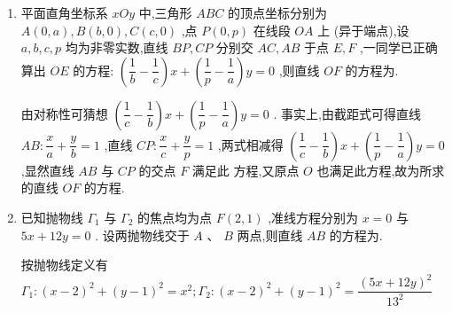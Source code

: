 \begin{enumerate}
\begin{jieda}
        $AF: y = 2\sqrt{2}\left(x-\dfrac{p}{2}\right)$，$BC: y = -\dfrac{\sqrt{2}}{4}\left(x-\dfrac{7p}{2}\right)$

        联立解得$E\left(\dfrac{5p}{6}, \dfrac{2\sqrt{2}p}{3}\right)$，故$\vv{EA} = \left(\dfrac{p}{6}, \dfrac{\sqrt{2}p}{3}\right)$，$\vv{EC} = \left(\dfrac{8p}{3}, -\dfrac{2\sqrt{2}p}{3}\right)$，故$S_{\triangle ACE} = \dfrac{1}{2}\left|\dfrac{p}{6} \times \left(-\dfrac{2\sqrt{2}p}{3} + \dfrac{\sqrt{2}p}{3} \times \dfrac{8p}{3}\right)\right| = 3\sqrt{2}$，解得$p = \sqrt{6}$
    \end{jieda}
    \item 平面直角坐标系 ${xOy}$ 中,三角形 ${ABC}$ 的顶点坐标分别为 $A\left( {0,a}\right) ,B\left( {b,0}\right) ,C\left( {c,0}\right)$ ,点 $P\left( {0,p}\right)$ 在线段 ${OA}$ 上 (异于端点),设 $a,b,c,p$ 均为非零实数,直线 ${BP},{CP}$ 分别交 ${AC},{AB}$ 于点 $E,F$ ,一同学已正确算出 ${OE}$ 的方程: $\left( {\dfrac{1}{b} - \dfrac{1}{c}}\right) x + \left( {\dfrac{1}{p} - \dfrac{1}{a}}\right) y = 0$ ,则直线 ${OF}$ 的方程为.
    \begin{jieda}
        由对称性可猜想 $\left( {\dfrac{1}{c} - \dfrac{1}{b}}\right) x + \left( {\dfrac{1}{p} - \dfrac{1}{a}}\right) y = 0$ .
        事实上,由截距式可得直线 ${AB} : \dfrac{x}{a} + \dfrac{y}{b} = 1$ ,直线 ${CP} : \dfrac{x}{c} + \dfrac{y}{p} = 1$ ,两式相减得 $\left( {\dfrac{1}{c} - \dfrac{1}{b}}\right) x + \left( {\dfrac{1}{p} - \dfrac{1}{a}}\right) y = 0$ ,显然直线 ${AB}$ 与 ${CP}$ 的交点 $F$ 满足此
        方程,又原点 $O$ 也满足此方程,故为所求的直线 ${OF}$ 的方程.
    \end{jieda}
    \item 已知抛物线 ${\Gamma }_{1}$ 与 ${\Gamma }_{2}$ 的焦点均为点 $F\left( {2,1}\right)$ ,准线方程分别为 $x = 0$ 与 ${5x} + {12y} = 0$ . 设两抛物线交于 $A$ 、 $B$ 两点,则直线 ${AB}$ 的方程为.
    \begin{jieda}
        按抛物线定义有 ${\Gamma }_{1} : {\left( x - 2\right) }^{2} + {\left( y - 1\right) }^{2} = {x}^{2};{\Gamma }_{2} : {\left( x - 2\right) }^{2} + {\left( y - 1\right) }^{2} = \dfrac{{\left( 5x + {12}y\right) }^{2}}{{13}^{2}}$ 
        

\end{jieda}
\end{enumerate}

